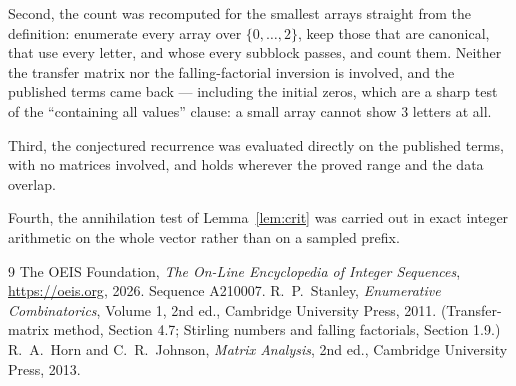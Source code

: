 \documentclass[11pt,a4paper]{article}
\theoremstyle{plain}
\theoremstyle{definition}
\begin{document}
Second, the count was recomputed for the smallest arrays straight from the definition:
enumerate every array over $\{0,\dots,2\}$, keep those that are canonical, that use every
letter, and whose every subblock passes, and count them. Neither the transfer matrix nor the
falling-factorial inversion is involved, and the published terms came back --- including the
initial zeros, which are a sharp test of the ``containing all values'' clause: a small array
cannot show $3$ letters at all.

Third, the conjectured recurrence was evaluated directly on the published terms, with no
matrices involved, and holds wherever the proved range and the data overlap.

Fourth, the annihilation test of Lemma~\ref{lem:crit} was carried out in exact integer
arithmetic on the whole vector rather than on a sampled prefix.

\begin{thebibliography}{9}
 The OEIS Foundation, \emph{The On-Line Encyclopedia of Integer
Sequences}, \url{https://oeis.org}, 2026. Sequence A210007.
 R.~P.~Stanley, \emph{Enumerative Combinatorics}, Volume 1, 2nd ed.,
Cambridge University Press, 2011. (Transfer-matrix method, Section 4.7; Stirling numbers and
falling factorials, Section 1.9.)
 R.~A.~Horn and C.~R.~Johnson, \emph{Matrix Analysis}, 2nd ed., Cambridge
University Press, 2013.
\end{thebibliography}
\end{document}
